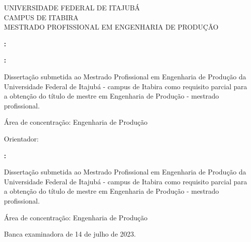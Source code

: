     \onehalfspacing \begin{center}
        UNIVERSIDADE FEDERAL DE ITAJUBÁ\\
        CAMPUS DE ITABIRA \\
        MESTRADO PROFISSIONAL EM ENGENHARIA DE PRODUÇÃO 
    \end{center}
    \vspace{5cm}
    \center \AuthorName
    \vspace{5cm}
    \center \Title \textbf{:} \Subtitle
    \null\vfil
    \center \Location
    \center \Year
    \pagestyle{empty}
    \pagebreak

    \center \AuthorName
    \vspace{9cm}
    \center \Title \textbf{:} \Subtitle

    \vspace{4cm}
    \begin{changemargin}{8cm}{0cm} 
        \begin{fontsize}{10}{12} \selectfont
            Dissertação submetida ao Mestrado Profissional em Engenharia de Produção da Universidade Federal de Itajubá - campus de Itabira como requisito parcial para a obtenção do título de mestre em Engenharia de Produção - mestrado profissional. 
            
            Área de concentração: Engenharia de Produção

            Orientador: \Supervisor
        \end{fontsize}
    \end{changemargin}
    \null\vfil
    \center \Location
    \center \Year
    \pagebreak

    \center \AuthorName
    \vspace{5cm}
    \center \Title \textbf{:} \Subtitle

    \vspace{4cm}
    \begin{changemargin}{8cm}{0cm} 
        \begin{fontsize}{10}{12} \selectfont
            Dissertação submetida ao Mestrado Profissional em Engenharia de Produção da Universidade Federal de Itajubá - campus de Itabira como requisito parcial para a obtenção do título de mestre em Engenharia de Produção - mestrado profissional. 
            
            Área de concentração: Engenharia de Produção

            Banca examinadora de 14 de julho de 2023.
            
        \end{fontsize}
    \end{changemargin}

